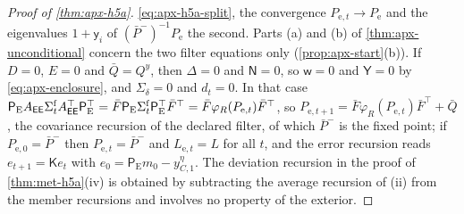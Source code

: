 \begin{proof}[Proof of \cref{thm:apx-h5a}]
\eqref{eq:apx-h5a-split}, the convergence $P_{\mathrm e,t}\to P_{\mathrm e}$ and the eigenvalues $1+\mathsf y_i$ of $(\bar P^-)^{-1}P_{\mathrm e}$ the second. Parts (a) and (b) of \cref{thm:apx-unconditional} concern the two filter equations only (\cref{prop:apx-start}(b)). If $D=0$, $E=0$ and $\bar Q=Q^y$, then $\Delta=0$ and $\mathsf N=0$, so $\mathsf w=0$ and $\mathsf Y=0$ by \cref{eq:apx-enclosure}, and $\Sigma_\delta=0$ and $d_t=0$. In that case $\mathsf P_{\mathrm E}A_{\mathsf{E}\mathsf{E}}\Sigma^{\mathrm f}_tA_{\mathsf{E}\mathsf{E}}^\top\mathsf P_{\mathrm E}^\top=\bar F\mathsf P_{\mathrm E}\Sigma^{\mathrm f}_t\mathsf P_{\mathrm E}^\top\bar F^\top=\bar F\varphi_R(P_{\mathrm e,t})\bar F^\top$, so $P_{\mathrm e,t+1}=\bar F\varphi_R(P_{\mathrm e,t})\bar F^\top+\bar Q$, the covariance recursion of the declared filter, of which $\bar P^-$ is the fixed point; if $P_{\mathrm e,0}=\bar P^-$ then $P_{\mathrm e,t}=\bar P^-$ and $L_{\mathrm e,t}=L$ for all $t$, and the error recursion reads $e_{t+1}=\mathsf Ke_t$ with $e_0=\mathsf P_{\mathrm E}m_0-y^\eta_{C,1}$. The deviation recursion in the proof of \cref{thm:met-h5a}(iv) is obtained by subtracting the average recursion of (ii) from the member recursions and involves no property of the exterior.


\end{proof}
